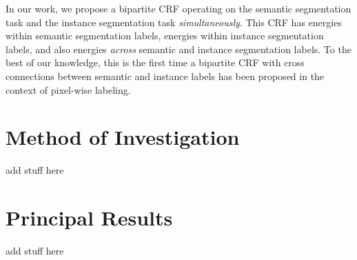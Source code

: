 In our work, we propose a bipartite CRF operating on the semantic segmentation task and the instance segmentation task \emph{simultaneously}. This CRF has energies within semantic segmentation labels, energies within instance segmentation labels, and also energies \emph{across} semantic and instance segmentation labels. To the best of our knowledge, this is the first time a bipartite CRF with cross connections between semantic and instance labels has been proposed in the context of pixel-wise labeling.

\section{Method of Investigation}
add stuff here
\section{Principal Results}
add stuff here